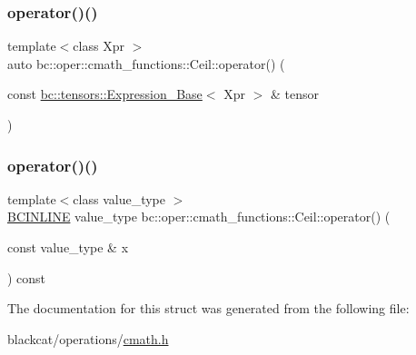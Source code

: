 \mbox{\label{structbc_1_1oper_1_1cmath__functions_1_1Ceil_ab4487a71061a0b560d0cfc571232ad8e}} 
\subsubsection{\texorpdfstring{operator()()}{operator()()}\hspace{0.1cm}{\footnotesize\ttfamily [2/3]}}
{\footnotesize\ttfamily template$<$class Xpr $>$ \\
auto bc\+::oper\+::cmath\+\_\+functions\+::\+Ceil\+::operator() (\begin{DoxyParamCaption}\item[{const \hyperlink{classbc_1_1tensors_1_1Expression__Base}{bc\+::tensors\+::\+Expression\+\_\+\+Base}$<$ Xpr $>$ \&}]{tensor }\end{DoxyParamCaption})\hspace{0.3cm}{\ttfamily [inline]}}

\mbox{\label{structbc_1_1oper_1_1cmath__functions_1_1Ceil_a32f628d13c73057bbe5f554981bf8e87}} 
\subsubsection{\texorpdfstring{operator()()}{operator()()}\hspace{0.1cm}{\footnotesize\ttfamily [3/3]}}
{\footnotesize\ttfamily template$<$class value\+\_\+type $>$ \\
\hyperlink{common_8h_a6699e8b0449da5c0fafb878e59c1d4b1}{B\+C\+I\+N\+L\+I\+NE} value\+\_\+type bc\+::oper\+::cmath\+\_\+functions\+::\+Ceil\+::operator() (\begin{DoxyParamCaption}\item[{const value\+\_\+type \&}]{x }\end{DoxyParamCaption}) const\hspace{0.3cm}{\ttfamily [inline]}}



The documentation for this struct was generated from the following file\+:\begin{DoxyCompactItemize}
\item 
blackcat/operations/\hyperlink{cmath_8h}{cmath.\+h}\end{DoxyCompactItemize}
